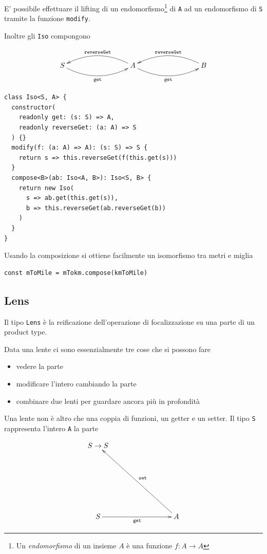 \documentclass[12pt]{article}
\begin{document}
E' possibile effettuare il lifting di un endomorfismo\footnote{Un \emph{endomorfismo} di un insieme $A$ è una funzione $f: A \rightarrow A$}
di \texttt{A} ad un endomorfismo di \texttt{S} tramite la funzione \texttt{modify}.

Inoltre gli \texttt{Iso} compongono

\[
\xymatrixrowsep{3cm}
\xymatrixcolsep{3cm}
\xymatrix{
  S \ar@/_0.5cm/[r]_{\texttt{get}} & A \ar@/_0.5cm/[l]_{\texttt{reverseGet}} \ar@/_0.5cm/[r]_{\texttt{get}} & B \ar@/_0.5cm/[l]_{\texttt{reverseGet}}
}
\]

\begin{verbatim}
class Iso<S, A> {
  constructor(
    readonly get: (s: S) => A,
    readonly reverseGet: (a: A) => S
  ) {}
  modify(f: (a: A) => A): (s: S) => S {
    return s => this.reverseGet(f(this.get(s)))
  }
  compose<B>(ab: Iso<A, B>): Iso<S, B> {
    return new Iso(
      s => ab.get(this.get(s)),
      b => this.reverseGet(ab.reverseGet(b))
    )
  }
}
\end{verbatim}

Usando la composizione si ottiene facilmente un isomorfismo tra metri e miglia

\begin{verbatim}
const mToMile = mTokm.compose(kmToMile)
\end{verbatim}

\subsection{Lens}

Il tipo \texttt{Lens} è la reificazione dell'operazione di focalizzazione su una parte di un product type.

Data una lente ci sono essenzialmente tre cose che si possono fare

\begin{itemize}
  \item vedere la parte
  \item modificare l'intero cambiando la parte
  \item combinare due lenti per guardare ancora più in profondità
\end{itemize}

Una lente non è altro che una coppia di funzioni, un getter e un setter. Il tipo \texttt{S} rappresenta l'intero \texttt{A} la parte

\[
\xymatrixrowsep{3cm}
\xymatrixcolsep{3cm}
\xymatrix{
  {S \rightarrow S} \\
  S \ar[r]_{\texttt{get}} & A \ar[lu]_{\texttt{set}}
}
\]
\end{document}
